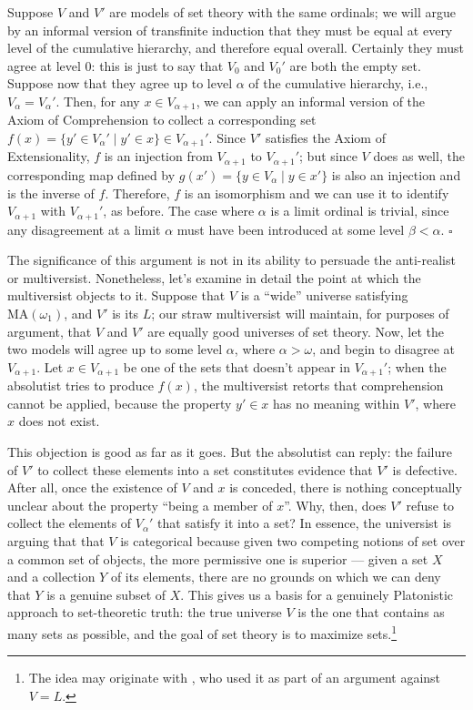 \documentclass[letterpaper,12pt]{article}
\begin{document}
Suppose $V$ and $V'$ are models of set theory with the same ordinals; we will argue by an informal version of transfinite induction that they must be equal at every level of the cumulative hierarchy, and therefore equal overall. Certainly they must agree at level $0$: this is just to say that $V_0$ and $V_0'$ are both the empty set. Suppose now that they agree up to level $\alpha$ of the cumulative hierarchy, i.e., $V_\alpha = V_\alpha'$. Then, for any $x \in V_{\alpha+1}$, we can apply an informal version of the Axiom of Comprehension to collect a corresponding set $f(x) = \{y' \in V_\alpha' \mid y' \in x\} \in V_{\alpha+1}'$. Since $V'$ satisfies the Axiom of Extensionality, $f$ is an injection from $V_{\alpha + 1}$ to $V_{\alpha+1}'$; but since $V$ does as well, the corresponding map defined by $g(x') = \{y \in V_\alpha \mid y \in x'\}$ is also an injection and is the inverse of $f$. Therefore, $f$ is an isomorphism and we can use it to identify $V_{\alpha+1}$ with $V_{\alpha+1}'$, as before. The case where $\alpha$ is a limit ordinal is trivial, since any disagreement at a limit $\alpha$ must have been introduced at some level $\beta < \alpha$. $\square$

The significance of this argument is not in its ability to persuade the anti-realist or multiversist. Nonetheless, let's examine in detail the point at which the multiversist objects to it. Suppose that $V$ is a ``wide'' universe satisfying $\mathrm{MA}(\omega_1)$, and $V'$ is its $L$; our straw multiversist will maintain, for purposes of argument, that $V$ and $V'$ are equally good universes of set theory. Now, let  the two models will agree up to some level $\alpha$, where $\alpha > \omega$, and begin to disagree at $V_{\alpha + 1}$. Let $x \in V_{\alpha+1}$ be one of the sets that doesn't appear in $V_{\alpha+1}'$; when the absolutist tries to produce $f(x)$, the multiversist retorts that comprehension cannot be applied, because the property $y' \in x$ has no meaning within $V'$, where $x$ does not exist.

This objection is good as far as it goes. But the absolutist can reply: the failure of $V'$ to collect these elements into a set constitutes evidence that $V'$ is defective. After all, once the existence of $V$ and $x$ is conceded, there is nothing conceptually unclear about the property ``being a member of $x$''. Why, then, does $V'$ refuse to collect the elements of $V_\alpha'$ that satisfy it into a set? In essence, the universist is arguing that that $V$ is categorical because given two competing notions of set over a common set of objects, the more permissive one is superior --- given a set $X$ and a collection $Y$ of its elements, there are no grounds on which we can deny that $Y$ is a genuine subset of $X$. This gives us a basis for a genuinely Platonistic approach to set-theoretic truth: the true universe $V$ is the one that contains as many sets as possible, and the goal of set theory is to maximize sets.\footnote{The idea may originate with \cite{Godel1964-GODWIC}, who used it as part of an argument against $V = L$.}
\end{document}
